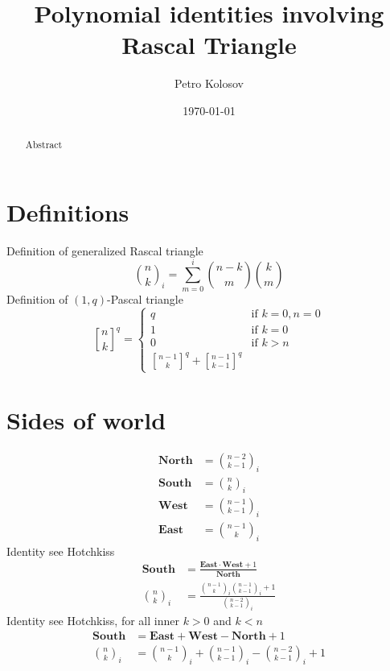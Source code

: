\documentclass[12pt,letterpaper,oneside,reqno]{amsart}
\title[Polynomial identities involving Rascal Triangle]
{Polynomial identities involving Rascal Triangle}
\author[Petro Kolosov]{Petro Kolosov}
\date{\today}
\newcommand \rascalNumber [3] {\binom{#1}{#2}_{#3}}
\newcommand \north[0] {\mathbf{North}}
\newcommand \south[0] {\mathbf{South}}
\newcommand \west[0] {\mathbf{West}}
\newcommand \east[0] {\mathbf{East}}
\newcommand{\genstirlingI}[3]{%
    \genfrac{[}{]}{0pt}{#1}{#2}{#3}%
}
\newcommand{\oneQBinomial}[3]{\genstirlingI{}{#1}{#2}^{#3}}
\numberwithin{equation}{section}
\begin{document}
\begin{abstract}
    Abstract
\end{abstract}

\maketitle


\section{Definitions}
Definition of generalized Rascal triangle
\begin{equation}
    \rascalNumber{n}{k}{i} = \sum_{m=0}^{i} \binom{n-k}{m} \binom{k}{m}
\end{equation}
Definition of $(1, q)$-Pascal triangle
\begin{equation*}
    \oneQBinomial{n}{k}{q} =
    \begin{cases}
        q & \text{if } k=0, n=0 \\
        1 & \text{if } k=0 \\
        0 & \text{if } k > n \\
        \oneQBinomial{n-1}{k}{q} + \oneQBinomial{n-1}{k-1}{q}
    \end{cases}
\end{equation*}


\section{Sides of world}
\begin{align*}
    \north &= \rascalNumber{n-2}{k-1}{i} \\
    \south &= \rascalNumber{n}{k}{i} \\
    \west  &= \rascalNumber{n-1}{k-1}{i} \\
    \east  &= \rascalNumber{n-1}{k}{i}
\end{align*}
Identity see Hotchkiss
\begin{align}
    \south                  &= \frac{\east \cdot \west + 1}{\north} \\
    \rascalNumber{n}{k}{i}  &= \frac{\rascalNumber{n-1}{k}{i} \rascalNumber{n-1}{k-1}{i} +1}{\rascalNumber{n-2}{k-1}{i}}
\end{align}
Identity see Hotchkiss, for all inner $k > 0$ and $k < n$
\begin{align}
    \south                 &= \east + \west - \north  + 1 \\
    \rascalNumber{n}{k}{i} &= \rascalNumber{n-1}{k}{i} + \rascalNumber{n-1}{k-1}{i} - \rascalNumber{n-2}{k-1}{i} + 1
\end{align}
\end{document}
